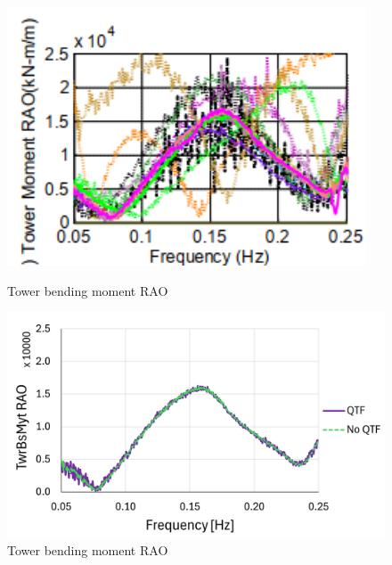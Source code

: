 \documentclass[a4paper, 11pt]{article}
\begin{document}
\begin{figure}[H]
    \begin{minipage}{0.48\textwidth}
        \centering
        \includegraphics[width=0.95\textwidth]{2.6_twr.png}
        \caption{\small Tower bending moment RAO \cite{Robertson2014}}
        \label{fig:2.6_twr}
    \end{minipage}
    \hfill
    \begin{minipage}{0.5\textwidth}
        \centering
        \vspace{0.6cm}
        \includegraphics[width=1\textwidth]{2.6_twr_mine.png}
        \caption{\small Tower bending moment RAO} 
        \label{fig:2.6_twr_mine}
    \end{minipage}
\end{figure}
\end{document}
